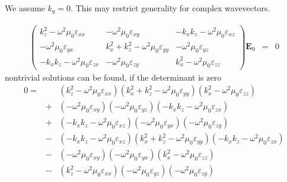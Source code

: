 \documentclass[12pt,a4paper,twoside,openright,BCOR10mm,headsepline,titlepage,abstracton,chapterprefix,final]{scrreprt}
\newcommand\Vector[1]{{\mathbf{#1}}}
\newcommand\vacuum{0}
\newcommand\wavenumber{k}
\newcommand\scalarEfield{E}
\newcommand\Efield{\Vector{\scalarEfield}}
\newcommand\vacuumpermeability{\scalarpermeability_{\vacuum}}
\newcommand\scalarpermeability{\mu}
\newcommand\scalarpermittivity{\varepsilon}
\begin{document}
We assume $\wavenumber_y =0$.
This may restrict generality for complex wavevectors.

\begin{eqnarray}
\begin{pmatrix}
 \wavenumber_z^2 - \omega^2 \vacuumpermeability \scalarpermittivity_{xx} 
 &
 - \omega^2 \vacuumpermeability \scalarpermittivity_{xy}
 &
 - \wavenumber_x \wavenumber_z - \omega^2 \vacuumpermeability \scalarpermittivity_{xz}
 \\
 - \omega^2 \vacuumpermeability \scalarpermittivity_{yx}
 &
 \wavenumber_x^2 + \wavenumber_z^2 - \omega^2 \vacuumpermeability \scalarpermittivity_{yy} 
 &
 - \omega^2 \vacuumpermeability \scalarpermittivity_{yz}
 \\
 - \wavenumber_x \wavenumber_z - \omega^2 \vacuumpermeability \scalarpermittivity_{zx}
 &
 - \omega^2 \vacuumpermeability \scalarpermittivity_{zy}
 &
 \wavenumber_x^2 - \omega^2 \vacuumpermeability \scalarpermittivity_{zz}  
\end{pmatrix}
\Efield_0
&=& 0 \label{eq:generalDispersionEigenEquation}
\end{eqnarray}
nontrivial solutions can be found, if the determinant is zero
\begin{eqnarray}
 0 =&&
     ( \wavenumber_z^2 - \omega^2 \vacuumpermeability \scalarpermittivity_{xx} ) 
     ( \wavenumber_x^2 + \wavenumber_z^2 - \omega^2 \vacuumpermeability \scalarpermittivity_{yy} )
     ( \wavenumber_x^2 - \omega^2 \vacuumpermeability \scalarpermittivity_{zz} )
   \nonumber\\
   &+&
     ( - \omega^2 \vacuumpermeability \scalarpermittivity_{xy} )  
     ( - \omega^2 \vacuumpermeability \scalarpermittivity_{yz} )
     ( - \wavenumber_x \wavenumber_z - \omega^2 \vacuumpermeability \scalarpermittivity_{zx} )
   \nonumber\\
   &+&
     ( - \wavenumber_x \wavenumber_z - \omega^2 \vacuumpermeability \scalarpermittivity_{xz} )
     ( - \omega^2 \vacuumpermeability \scalarpermittivity_{yx} )
     ( - \omega^2 \vacuumpermeability \scalarpermittivity_{zy} )
   \nonumber\\
   &-&  
     ( - \wavenumber_x \wavenumber_z - \omega^2 \vacuumpermeability \scalarpermittivity_{xz} )
     (   \wavenumber_x^2 + \wavenumber_z^2 - \omega^2 \vacuumpermeability \scalarpermittivity_{yy} )
     ( - \wavenumber_x \wavenumber_z - \omega^2 \vacuumpermeability \scalarpermittivity_{zx} )
   \nonumber\\
   &-&
     ( - \omega^2 \vacuumpermeability \scalarpermittivity_{xy} )
     ( - \omega^2 \vacuumpermeability \scalarpermittivity_{yx} )
     (   \wavenumber_x^2 - \omega^2 \vacuumpermeability \scalarpermittivity_{zz} )
   \nonumber\\
   &-&
     (   \wavenumber_z^2 - \omega^2 \vacuumpermeability \scalarpermittivity_{xx} )
     ( - \omega^2 \vacuumpermeability \scalarpermittivity_{yz} )
     (  - \omega^2 \vacuumpermeability \scalarpermittivity_{zy} )
\end{eqnarray}
\end{document}
